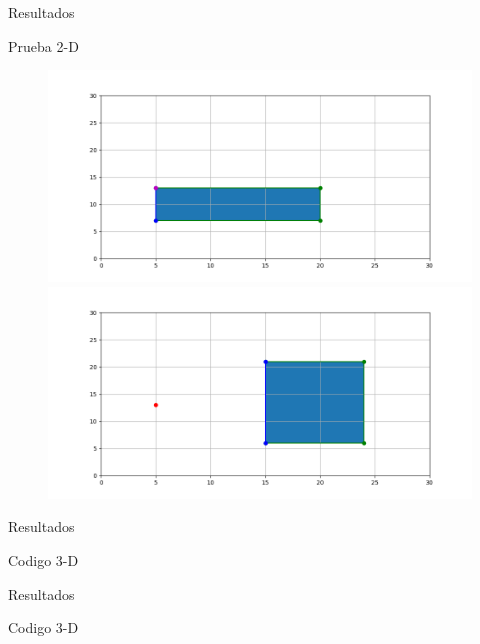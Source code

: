 \documentclass[11pt]{beamer}
\begin{document}
\begin{frame}{Resultados}
 \begin{block}{Prueba 2-D}
\begin{figure}
 \includegraphics[width = 0.6\linewidth]{img/Figura_vertice}
 \includegraphics[width = 0.6\linewidth]{img/figura_fuera}
\end{figure}
 \end{block}
\end{frame}

\begin{frame}{Resultados}
 \begin{block}{Codigo 3-D}
  
 \end{block}
\end{frame}

\begin{frame}{Resultados}
 \begin{block}{Codigo 3-D}
  
 \end{block}
\end{frame}
\end{document}
